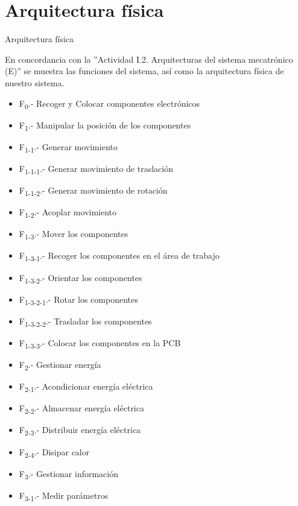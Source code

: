 \section{Arquitectura f\'isica}
\label{Arquitectura_fisica}

Arquitectura f\'isica
\par
En concordancia con la ''Actividad I.2. Arquitecturas del sistema mecatr\'onico (E)'' se muestra las funciones del sistema, as\'i como la arquitectura f\'isica de nuestro sistema.\par

\begin{itemize}
\item F\textsubscript{0}.- Recoger y Colocar componentes electr\'onicos
\\
\item F\textsubscript{1}.- Manipular la posici\'on de los componentes
\item F\textsubscript{1-1}.- Generar movimiento
\item F\textsubscript{1-1-1}.- Generar movimiento de traslaci\'on
\item F\textsubscript{1-1-2}.- Generar movimiento de rotaci\'on
\item F\textsubscript{1-2}.- Acoplar movimiento
\item F\textsubscript{1-3}.- Mover los componentes
\item F\textsubscript{1-3-1}.- Recoger los componentes en el \'area de trabajo
\item F\textsubscript{1-3-2}.- Orientar los componentes
\item F\textsubscript{1-3-2-1}.- Rotar los componentes
\item F\textsubscript{1-3-2-2}.- Trasladar los componentes
\item F\textsubscript{1-3-3}.- Colocar los componentes en la PCB
\item F\textsubscript{2}.- Gestionar energ\'ia
\item F\textsubscript{2-1}.- Acondicionar energ\'ia el\'ectrica
\item F\textsubscript{2-2}.- Almacenar energ\'ia el\'ectrica
\item F\textsubscript{2-3}.- Distribuir energ\'ia el\'ectrica
\item F\textsubscript{2-4}.- Disipar calor
\\
\item F\textsubscript{3}.- Gestionar informaci\'on
\item F\textsubscript{3-1}.- Medir par\'ametros

\end{itemize}
